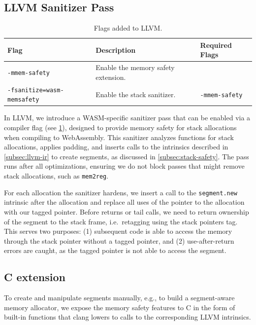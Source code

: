 \subsection{LLVM Sanitizer Pass}
\label{subsec:llvm-sanitizer-pass}

\begin{table}[h]
    \centering
    \caption{Flags added to LLVM.}
    \label{tab:llvm-flags}
    \begin{tabular}{l | l | l}
        \textbf{Flag}                      & \textbf{Description}                & \textbf{Required Flags} \\
        \hline
        \texttt{-mmem-safety}              & Enable the memory safety extension. &                         \\
        \texttt{-fsanitize=wasm-memsafety} & Enable the stack sanitizer.         & \texttt{-mmem-safety}   \\
    \end{tabular}
\end{table}

In LLVM, we introduce a \ac{WASM}-specific sanitizer pass that can be enabled via a compiler flag (see \cref{tab:llvm-flags}), designed to provide memory safety for stack allocations when compiling to WebAssembly.
This sanitizer analyzes functions for stack allocations, applies padding, and inserts calls to the intrinsics described in \cref{subsec:llvm-ir} to create segments, as discussed in \cref{subsec:stack-safety}.
The pass runs after all optimizations, ensuring we do not block passes that might remove stack allocations, such as \texttt{mem2reg}.

For each allocation the sanitizer hardens, we insert a call to the \texttt{segment.new} intrinsic after the allocation and replace all uses of the pointer to the allocation with our tagged pointer.
Before returns or tail calls, we need to return ownership of the segment to the stack frame, i.e.\ retagging using the stack pointers tag.
This serves two purposes: (1) subsequent code is able to access the memory through the stack pointer without a tagged pointer, and (2) use-after-return errors are caught, as the tagged pointer is not able to access the segment.

\subsection{C extension}
\label{subsec:c-extension}

To create and manipulate segments manually, e.g., to build a segment-aware memory allocator, we expose the memory safety features to C in the form of built-in functions that clang lowers to calls to the corresponding LLVM intrinsics.

